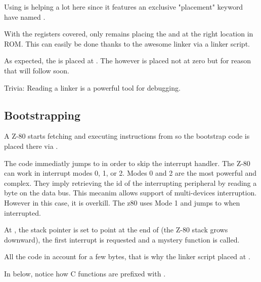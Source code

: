 Using  is helping a lot here since it features an exclusive "placement" keyword have named .



With the registers covered, only remains placing the  and  at the right location in ROM. This can easily be done thanks to the awesome  linker via a linker script.



As expected, the  is placed at . The  however is placed not at zero but  for reason that will follow soon.

\begin{trivia}
Trivia: Reading a linker  is a powerful tool for debugging.
\end{trivia}

\subsection{Bootstrapping}
A Z-80 starts fetching and executing instructions from  so the bootstrap code  is placed there via .

The code immediatly jumps to  in order to skip the interrupt handler. The Z-80 can work in interrupt modes 0, 1, or 2. Modes 0 and 2 are the most powerful and complex. They imply retrieving the id of the interrupting peripheral by reading a byte on the data bus. This mecanim allows support of multi-devices interruption. However in this case, it is overkill. The z80 uses Mode 1 and jumps to  when interrupted.

At , the stack pointer  is set to point at the end of  (the Z-80 stack grows downward), the first interrupt is requested and a mystery  function is called.

All the code in  account for a few bytes, that is why the linker script placed  at .

In  below, notice how C functions are prefixed with \icode{\_}.










